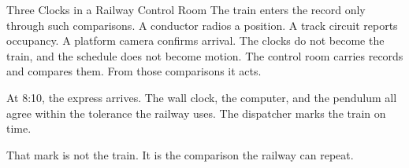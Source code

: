 \begin{coda}{Three Clocks in a Railway Control Room}
The train enters the record only through such comparisons. A conductor radios a
position. A track circuit reports occupancy. A platform camera confirms arrival.
The clocks do not become the train, and the schedule does not become motion.
The control room carries records and compares them. From those comparisons it
acts.

At 8:10, the express arrives. The wall clock, the computer, and the pendulum all
agree within the tolerance the railway uses. The dispatcher marks the train on
time.

That mark is not the train. It is the comparison the railway can repeat.

\end{coda}
